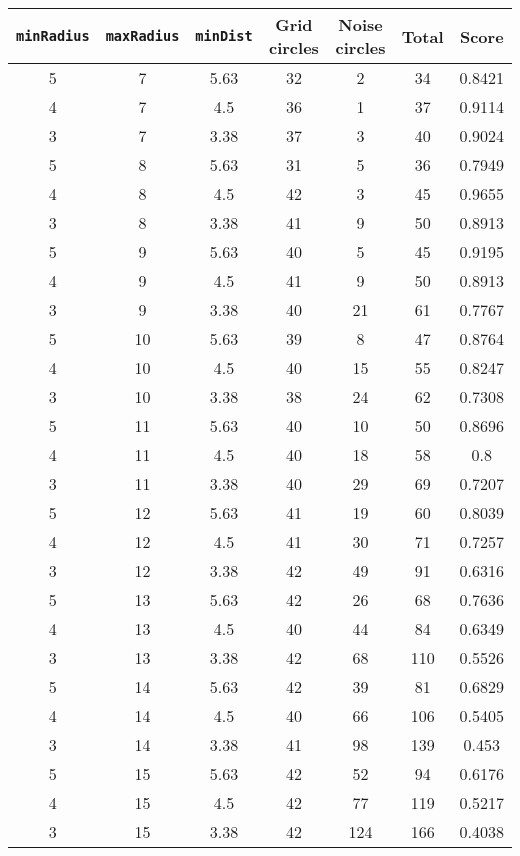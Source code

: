 \documentclass[letterpaper, 12pt]{article}
\begin{document}
\begin{longtable}{|c|c|c|c|c|c|c|}
\hline
\textbf{\texttt{minRadius}} & \textbf{\texttt{maxRadius}} & \textbf{\texttt{minDist}} & \textbf{Grid circles} & \textbf{Noise circles} & \textbf{Total} & \textbf{Score} \\
\hline
5 & 7 & 5.63 & 32 & 2 & 34 & 0.8421 \\
\hline
4 & 7 & 4.5 & 36 & 1 & 37 & 0.9114 \\
\hline
3 & 7 & 3.38 & 37 & 3 & 40 & 0.9024 \\
\hline
5 & 8 & 5.63 & 31 & 5 & 36 & 0.7949 \\
\hline
4 & 8 & 4.5 & 42 & 3 & 45 & 0.9655 \\
\hline
3 & 8 & 3.38 & 41 & 9 & 50 & 0.8913 \\
\hline
5 & 9 & 5.63 & 40 & 5 & 45 & 0.9195 \\
\hline
4 & 9 & 4.5 & 41 & 9 & 50 & 0.8913 \\
\hline
3 & 9 & 3.38 & 40 & 21 & 61 & 0.7767 \\
\hline
5 & 10 & 5.63 & 39 & 8 & 47 & 0.8764 \\
\hline
4 & 10 & 4.5 & 40 & 15 & 55 & 0.8247 \\
\hline
3 & 10 & 3.38 & 38 & 24 & 62 & 0.7308 \\
\hline
5 & 11 & 5.63 & 40 & 10 & 50 & 0.8696 \\
\hline
4 & 11 & 4.5 & 40 & 18 & 58 & 0.8 \\
\hline
3 & 11 & 3.38 & 40 & 29 & 69 & 0.7207 \\
\hline
5 & 12 & 5.63 & 41 & 19 & 60 & 0.8039 \\
\hline
4 & 12 & 4.5 & 41 & 30 & 71 & 0.7257 \\
\hline
3 & 12 & 3.38 & 42 & 49 & 91 & 0.6316 \\
\hline
5 & 13 & 5.63 & 42 & 26 & 68 & 0.7636 \\
\hline
4 & 13 & 4.5 & 40 & 44 & 84 & 0.6349 \\
\hline
3 & 13 & 3.38 & 42 & 68 & 110 & 0.5526 \\
\hline
5 & 14 & 5.63 & 42 & 39 & 81 & 0.6829 \\
\hline
4 & 14 & 4.5 & 40 & 66 & 106 & 0.5405 \\
\hline
3 & 14 & 3.38 & 41 & 98 & 139 & 0.453 \\
\hline
5 & 15 & 5.63 & 42 & 52 & 94 & 0.6176 \\
\hline
4 & 15 & 4.5 & 42 & 77 & 119 & 0.5217 \\
\hline
3 & 15 & 3.38 & 42 & 124 & 166 & 0.4038 \\

\end{longtable}
\end{document}
